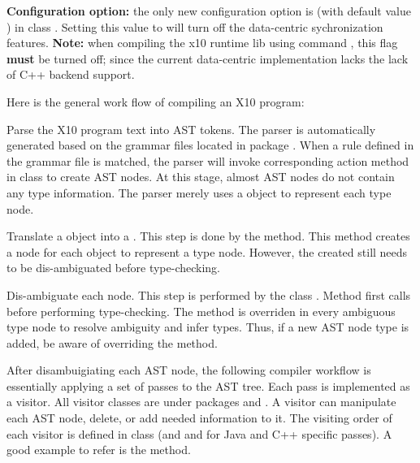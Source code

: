 \documentclass{article}
\begin{document}
\textbf{Configuration option: } the only new configuration option is  (with default value ) in class . Setting this value to  will turn off the data-centric sychronization features. \textbf{Note:} when compiling the x10 runtime lib using command , this flag \textbf{must} be turned off; since the current data-centric implementation lacks the lack of C++ backend support.

Here is the general work flow of compiling an X10 program:

\begin{enumerate}

\Item Parse the X10 program text into AST tokens. The parser is automatically generated based on the grammar files located in package  . When a rule defined in the  grammar file is matched, the parser will invoke corresponding action method in class  to create AST nodes.  At this stage, almost AST nodes do not contain any type information. The parser merely uses a  object to represent each type node.

\Item Translate a  object into a . This step is done by the  method. This method creates a  node for each  object to represent a type node. However, the created  still needs to be dis-ambiguated before type-checking.

\Item Dis-ambiguate each  node. This step is performed by the class . Method  first calls  before performing type-checking. The  method is overriden in every ambiguous type node to resolve ambiguity and infer types. Thus, if a new AST node type is added,  be aware of overriding the  method.

\Item After disambuigiating each AST node, the following compiler workflow is essentially applying a set of passes to the AST tree. Each pass is implemented as a visitor. All visitor classes are under packages   and .  A visitor can manipulate each AST node,  delete, or add needed information to it. The visiting order of each visitor is defined in class  (and  and  for Java and C++ specific passes). A good example to refer is the   method.


\end{enumerate}
\end{document}
